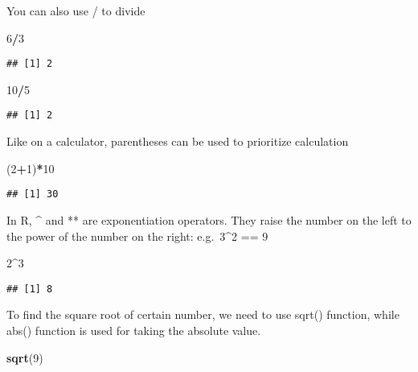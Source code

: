 \documentclass[
]{article}
\newenvironment{Shaded}{\begin{snugshade}}{\end{snugshade}}
\newcommand{\DecValTok}[1]{\textcolor[rgb]{0.00,0.00,0.81}{#1}}
\newcommand{\KeywordTok}[1]{\textcolor[rgb]{0.13,0.29,0.53}{\textbf{#1}}}
\newcommand{\NormalTok}[1]{#1}
\newcommand{\OperatorTok}[1]{\textcolor[rgb]{0.81,0.36,0.00}{\textbf{#1}}}
\begin{document}
You can also use / to divide

\begin{Shaded}
\begin{Highlighting}[]
  \DecValTok{6}\OperatorTok{/}\DecValTok{3}
\end{Highlighting}
\end{Shaded}

\begin{verbatim}
## [1] 2
\end{verbatim}

\begin{Shaded}
\begin{Highlighting}[]
  \DecValTok{10}\OperatorTok{/}\DecValTok{5}
\end{Highlighting}
\end{Shaded}

\begin{verbatim}
## [1] 2
\end{verbatim}

Like on a calculator, parentheses can be used to prioritize calculation

\begin{Shaded}
\begin{Highlighting}[]
\NormalTok{ (}\DecValTok{2}\OperatorTok{+}\DecValTok{1}\NormalTok{)}\OperatorTok{*}\DecValTok{10}
\end{Highlighting}
\end{Shaded}

\begin{verbatim}
## [1] 30
\end{verbatim}

In R, \^{} and ** are exponentiation operators. They raise the number on
the left to the power of the number on the right: e.g.~3\^{}2 == 9

\begin{Shaded}
\begin{Highlighting}[]
 \DecValTok{2}\OperatorTok{^}\DecValTok{3}
\end{Highlighting}
\end{Shaded}

\begin{verbatim}
## [1] 8
\end{verbatim}

To find the square root of certain number, we need to use sqrt()
function, while abs() function is used for taking the absolute value.

\begin{Shaded}
\begin{Highlighting}[]
\KeywordTok{sqrt}\NormalTok{(}\DecValTok{9}\NormalTok{)}
\end{Highlighting}
\end{Shaded}
\end{document}
